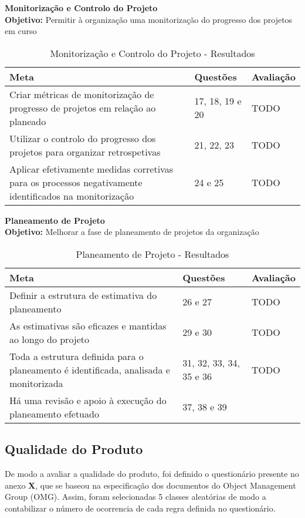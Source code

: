 \documentclass[openany,10pt,a4paper]{article}
\begin{document}
\textbf{Monitorização e Controlo do Projeto}  \\
\textbf{Objetivo:} Permitir à organização uma monitorização do progresso dos projetos em curso
    
\begin{table}[]
    \centering
    \caption{Monitorização e Controlo do Projeto - Resultados}
    \begin{tabular}{p{2in}|p{2in}|p{2in}}
         \hline	
		\textbf{Meta} & \textbf{Questões} & \textbf{Avaliação} \\ \hline
		Criar métricas de monitorização de progresso de projetos em relação ao planeado & 17, 18, 19 e 20 & TODO \\ \hline
		Utilizar o controlo do progresso dos projetos para organizar retrospetivas & 21, 22, 23 & TODO \\ \hline
		Aplicar efetivamente medidas corretivas para os processos negativamente identificados na monitorização & 24 e 25 & TODO \\ \hline
    \end{tabular}
    \label{tab:analise-monitorizacao}
\end{table}

\textbf{Planeamento de Projeto}  \\
\textbf{Objetivo:} Melhorar a fase de planeamento de projetos da organização

\begin{table}[]
    \centering
    \caption{Planeamento de Projeto - Resultados}
    \begin{tabular}{p{3in}|p{2in}|p{1in}}
        \hline	
		\textbf{Meta} & \textbf{Questões} & \textbf{Avaliação} \\ \hline
		Definir a estrutura de estimativa do planeamento & 26 e 27 & TODO \\ \hline
		As estimativas são eficazes e mantidas ao longo do projeto & 29 e 30 & TODO \\ \hline
		Toda a estrutura definida para o planeamento é identificada, analisada e monitorizada & 31, 32, 33, 34, 35 e 36 & TODO \\ \hline
		Há uma revisão e apoio à execução do planeamento efetuado & 37, 38 e 39
	\end{tabular}
    \label{tab:analise-planeamento}
\end{table}



\subsection{Qualidade do Produto}
De modo a avaliar a qualidade do produto, foi definido o questionário presente no anexo \textbf{X}, que se baseou na especificação dos documentos do Object Management Group (OMG). Assim, foram selecionadas 5 classes aleatórias de modo a contabilizar o número de ocorrencia de cada regra definida no questionário. 
\end{document}
